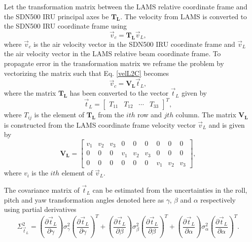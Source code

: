 \documentclass[12pt,twoside,english]{article}\usepackage[]{graphicx}\usepackage[]{color}
\begin{document}
Let the transformation matrix between the LAMS relative coordinate frame and the SDN500 IRU principal axes be $\mathbf{T_{L}}$. The velocity from LAMS is converted to the SDN500 IRU coordinate frame using  
\begin{equation}
\vec{v}_{c}=\mathbf{T_{L}}\vec{v}_{L},\label{velL2C}
\end{equation}
where $\vec{v}_{c}$ is the air velocity vector in the SDN500 IRU coordinate frame and $\vec{v}_{L}$ the air velocity vector in the LAMS relative beam coordinate frame. To propagate error in the transformation matrix we reframe the problem by vectorizing the matrix such that Eq. \eqref{velL2C} becomes  
\begin{equation}
\vec{v}_{c}=\mathbf{V_{L}}\vec{t}_{L},\label{velL2Cvect}
\end{equation}
where the matrix $\mathbf{T_{L}}$ has been converted to the vector $\vec{t}_{L}$ given by  
\begin{equation}
\vec{t}_{L}=\left[\begin{array}{cccc} T_{11} & T_{12} & \cdots & T_{33}\end{array}\right]^{T},\label{T2vec}
\end{equation}
where $T_{ij}$ is the element of $\mathbf{T_{L}}$ from the $ith$ row and $jth$ column. The matrix $\mathbf{V_{L}}$ is constructed from the LAMS coordinate frame velocity vector $\vec{v}_{L}$ and is given by  
\begin{equation}
\mathbf{V_{L}}=\left[\begin{array}{ccccccccc}
v_{1} & v_{2} & v_{3} & 0 & 0 & 0 & 0 & 0 & 0\\ 0 & 0 & 0 & v_{1} & v_{2} & v_{3} & 0 & 0 & 0\\ 0 & 0 & 0 & 0 & 0 & 0 & v_{1} & v_{2} & v_{3} 
\end{array}\right],\label{v2mat}
\end{equation}
where $v_{i}$ is the $ith$ element of $\vec{v}_{L}$. 

The covariance matrix of $\vec{t}_{L}$ can be estimated from the uncertainties in the roll, pitch and yaw transformation angles denoted here as $\gamma$, $\beta$ and $\alpha$ respectively using partial derivatives  
\begin{equation}
\Sigma_{\vec{t}_{L}}^{2}=\left(\frac{\partial\vec{t}_{L}}{\partial\gamma}\right)\sigma_{\gamma}^{2}\left(\frac{\partial\vec{t}_{L}}{\partial\gamma}\right)^{T}+\left(\frac{\partial\vec{t}_{L}}{\partial\beta}\right)\sigma_{\beta}^{2}\left(\frac{\partial\vec{t}_{L}}{\partial\beta}\right)^{T}+\left(\frac{\partial\vec{t}_{L}}{\partial\alpha}\right)\sigma_{\alpha}^{2}\left(\frac{\partial\vec{t}_{L}}{\partial\alpha}\right)^{T}.\label{tCov} 
\end{equation}
\end{document}
